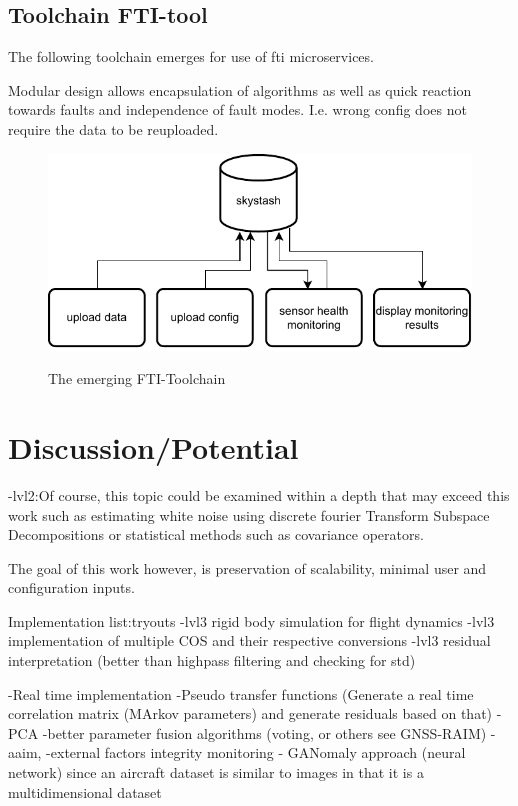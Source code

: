 \subsection{Toolchain FTI-tool}
The following toolchain emerges for use of fti microservices.

Modular design allows encapsulation of algorithms as well as quick reaction towards faults and independence of fault modes.
I.e. wrong config does not require the data to be reuploaded.


\begin{figure}
    \centering
    \includegraphics[width=.7\textwidth]{03_figures/FTI_microservices}
    \label{fig:fti-micro}
    \caption{The emerging FTI-Toolchain}
\end{figure}


\section{Discussion/Potential}

-lvl2:Of course, this topic could be examined within a depth that may exceed this work such as estimating white noise using discrete fourier Transform Subspace Decompositions \cite{hendriks_noise_2008} or statistical methods such as covariance operators.

The goal of this work however, is preservation of scalability, minimal user and configuration inputs.

Implementation list:tryouts
-lvl3 rigid body simulation for flight dynamics
-lvl3 implementation of multiple COS and their respective conversions
-lvl3 residual interpretation (better than highpass filtering and checking for std)

-Real time implementation
-Pseudo transfer functions (Generate a real time correlation matrix (MArkov parameters) and generate residuals based on that)
-PCA
-better parameter fusion algorithms (voting, or others see GNSS-RAIM)
        -aaim,
        -external factors integrity monitoring
- GANomaly approach (neural network) since an aircraft dataset is similar to images in that it is a multidimensional dataset


